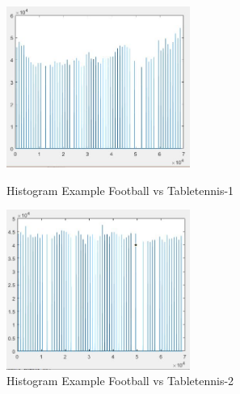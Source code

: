 \documentclass[runningheads,a4paper]{llncs}
\begin{document}
		\begin{figure}[htbp]
		\centering
		\begin{minipage}[t]{0.49\textwidth}
		\centering
		\includegraphics[width=6cm]{footballTabletennis-1.JPG}
		\caption{Histogram Example Football vs Tabletennis-1}
		\label{fig:he-5}
		\end{minipage}
		\begin{minipage}[t]{0.49\textwidth}
		\centering
		\includegraphics[width=6cm]{footballTabletennis-2.JPG}
		\caption{Histogram Example Football vs Tabletennis-2}
		\label{fig:he-6}
		\end{minipage}
		\end{figure}
\end{document}
